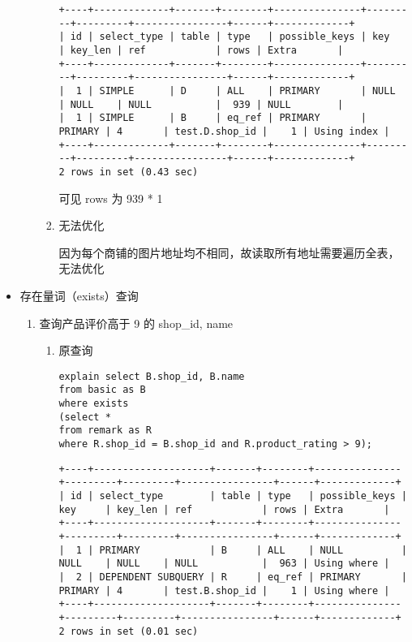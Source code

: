 \documentclass[11pt]{article}
\begin{document}
\begin{itemize}
\begin{enumerate}
\begin{enumerate}
\begin{verbatim}
+----+-------------+-------+--------+---------------+---------+---------+----------------+------+-------------+
| id | select_type | table | type   | possible_keys | key     | key_len | ref            | rows | Extra       |
+----+-------------+-------+--------+---------------+---------+---------+----------------+------+-------------+
|  1 | SIMPLE      | D     | ALL    | PRIMARY       | NULL    | NULL    | NULL           |  939 | NULL        |
|  1 | SIMPLE      | B     | eq_ref | PRIMARY       | PRIMARY | 4       | test.D.shop_id |    1 | Using index |
+----+-------------+-------+--------+---------------+---------+---------+----------------+------+-------------+
2 rows in set (0.43 sec)
\end{verbatim}

可见 rows 为 939 * 1

\item 无法优化

因为每个商铺的图片地址均不相同，故读取所有地址需要遍历全表，无法优化
\end{enumerate}
\end{enumerate}
\item 存在量词（exists）查询
\label{sec-3-2-2-3}
\begin{enumerate}
\item 查询产品评价高于 9 的 shop\_id, name
\begin{enumerate}
\item 原查询

\begin{lstlisting}
explain select B.shop_id, B.name
from basic as B
where exists
(select *
from remark as R
where R.shop_id = B.shop_id and R.product_rating > 9);
\end{lstlisting}

\begin{verbatim}
+----+--------------------+-------+--------+---------------+---------+---------+----------------+------+-------------+
| id | select_type        | table | type   | possible_keys | key     | key_len | ref            | rows | Extra       |
+----+--------------------+-------+--------+---------------+---------+---------+----------------+------+-------------+
|  1 | PRIMARY            | B     | ALL    | NULL          | NULL    | NULL    | NULL           |  963 | Using where |
|  2 | DEPENDENT SUBQUERY | R     | eq_ref | PRIMARY       | PRIMARY | 4       | test.B.shop_id |    1 | Using where |
+----+--------------------+-------+--------+---------------+---------+---------+----------------+------+-------------+
2 rows in set (0.01 sec)
\end{verbatim}


\end{enumerate}
\end{enumerate}
\end{itemize}
\end{document}
